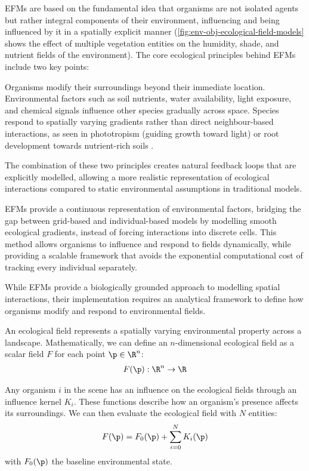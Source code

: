 EFMs are based on the fundamental idea that organisms are not isolated agents but rather integral components of their environment, influencing and being influenced by it in a spatially explicit manner (\cref{fig:env-obj-ecological-field-models} shows the effect of multiple vegetation entities on the humidity, shade, and nutrient fields of the environment). The core ecological principles behind EFMs include two key points:
\begin{Itemize}
     Organisms modify their surroundings beyond their immediate location. Environmental factors such as soil nutrients, water availability, light exposure, and chemical signals influence other species gradually across space.
     Species respond to spatially varying gradients rather than direct neighbour-based interactions, as seen in phototropism (guiding growth toward light) \cite{Pirk2012} or root development towards nutrient-rich soils \cite{Li2023}.
\end{Itemize}

The combination of these two principles creates natural feedback loops that are explicitly modelled, allowing a more realistic representation of ecological interactions compared to static environmental assumptions in traditional models.

EFMs provide a continuous representation of environmental factors, bridging the gap between grid-based and individual-based models by modelling smooth ecological gradients, instead of forcing interactions into discrete cells. This method allows organisms to influence and respond to fields dynamically, while providing a scalable framework that avoids the exponential computational cost of tracking every individual separately.

While EFMs provide a biologically grounded approach to modelling spatial interactions, their implementation requires an analytical framework to define how organisms modify and respond to environmental fields.





An ecological field represents a spatially varying environmental property across a landscape. Mathematically, we can define an $n$-dimensional ecological field as a scalar field $F$ for each point $\p \in \R^n$:
\begin{align}
    F(\p) : \R^n \to \R
\end{align}

Any organism $i$ in the scene has an influence on the ecological fields through an influence kernel $K_i$. These functions describe how an organism's presence affects its surroundings. We can then evaluate the ecological field with $N$ entities:
\begin{align}
    \label{eq:env-obj-eco-field-computation}
    F(\p) = F_0(\p) + \sum_{i=0}^{N}{K_i(\p)}
\end{align}
with $F_0(\p)$ the baseline environmental state.

